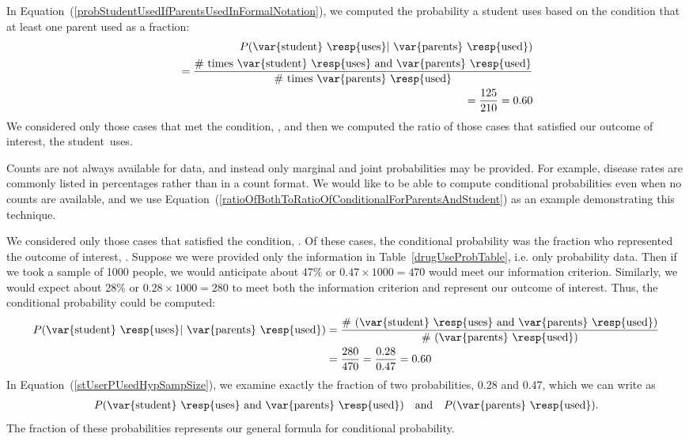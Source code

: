 In Equation~(\ref{probStudentUsedIfParentsUsedInFormalNotation}), we computed the probability a student uses based on the condition that at least one parent used as a fraction:
\begin{eqnarray}
&& P(\text{\var{student} \resp{uses}} | \text{ \var{parents} \resp{used}}) \notag \\
&&\quad = \frac{\text{\# times \var{student} \resp{uses} and \var{parents} \resp{used}}}{\text{\# times \var{parents} \resp{used}}} \label{ratioOfBothToRatioOfConditionalForParentsAndStudent} \\
&&\quad = \frac{125}{210} = 0.60 \notag
\end{eqnarray}
We considered only those cases that met the condition,  , and then we computed the ratio of those cases that satisfied our outcome of interest, the student~uses.

Counts are not always available for data, and instead only marginal and joint probabilities may be provided. For example, disease rates are commonly listed in percentages rather than in a count format. We would like to be able to compute conditional probabilities even when no counts are available, and we use Equation~(\ref{ratioOfBothToRatioOfConditionalForParentsAndStudent}) as an example demonstrating this technique.

We considered only those cases that satisfied the condition,  . Of these cases, the conditional probability was the fraction who represented the outcome of interest,  . Suppose we were provided only the information in Table~\vref{drugUseProbTable}, i.e. only probability data. Then if we took a sample of 1000 people, we would anticipate about 47\% or $0.47\times 1000 = 470$ would meet our information criterion. Similarly, we would expect about 28\% or $0.28\times 1000 = 280$ to meet both the information criterion and represent our outcome of interest. Thus, the conditional probability could be computed:
\begin{align}
P(\text{\var{student} \resp{uses}} | \text{ \var{parents} \resp{used}})
	&= \frac{\text{\# (\var{student} \resp{uses} and \var{parents} \resp{used})}}{\text{\# (\var{parents} \resp{used})}} \notag \\
	&= \frac{280}{470} = \frac{0.28}{0.47} = 0.60
\label{stUserPUsedHypSampSize}
\end{align}
In Equation~(\ref{stUserPUsedHypSampSize}), we examine exactly the fraction of two probabilities, 0.28 and 0.47, which we can write as
\begin{align*}
P(\text{\var{student} \resp{uses} and \var{parents} \resp{used}})
	\quad\text{and}\quad
	P(\text{\var{parents} \resp{used}}).
\end{align*}
The fraction of these probabilities represents our general formula for conditional probability.

